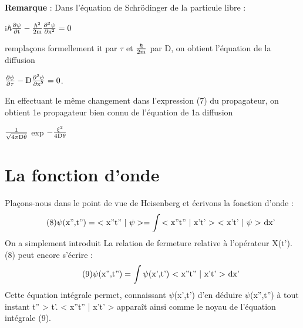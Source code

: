 {\bf Remarque} : Dans l'équation de Schrödinger de la particule libre :
\begin{center}
i$\hbar\frac{\partial\psi}{\partial\text{t}}-\frac{\hbar^2}{2\text{m}}\frac{\partial^2\psi}{\partial\text{x}^2} = 0$
\end{center}
remplaçons formellement it par $\tau$ et $\frac{\hbar}{2\text{m}}$ par D, on obtient l'équation de la diffusion
\begin{center}
$\frac{\partial\psi}{\partial\tau}-\text{D}\frac{\partial^2\psi}{\partial\text{x}^2} = 0$.
\end{center}

En effectuant le même changement dans l'expression (7) du propagateur,
on obtient 1e propagateur bien connu de l'équation de 1a diffusion
\begin{center}
$\frac{1}{\sqrt{4\pi\text{D}\theta}}$ exp $-\frac{\xi^2}{4\text{D}\theta}$
\end{center}

\section{La fonction d'onde}
Plaçons-nous dans le point de vue de Heisenberg et écrivons la
fonction d'onde :
\[
\tag{8} \psi(\text{x'',t''}) = \text{< x''t'' | }\psi > =
\int\text{< x''t'' | x't' > < x't' | }\psi \text{ > dx'}
\]
On a simplement introduit La relation de fermeture relative à l'opérateur
X(t').
(8) peut encore s'écrire :
\[
\tag{9} \psi(\text{x'',t''}) = \int\psi\text{(x',t') < x''t'' | x't' > dx'}
\]
Cette équation intégrale permet, connaissant $\psi$(x',t') d'en déduire $\psi$(x'',t'')
à tout instant t'' > t'. < x''t'' | x't' > apparaît ainsi comme le noyau de
l'équation intégrale (9).

